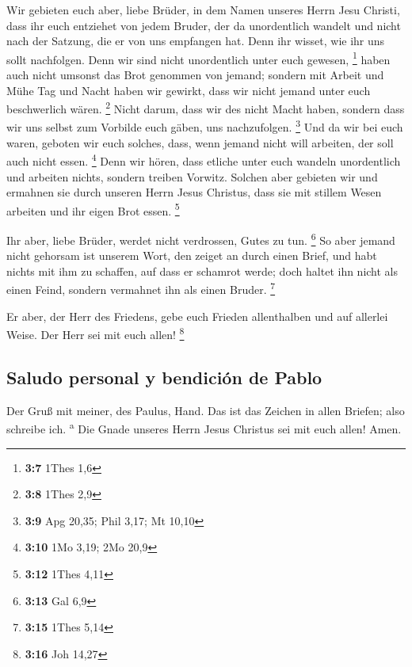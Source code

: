  Wir gebieten euch aber, liebe Brüder, in dem Namen
unseres Herrn Jesu Christi, dass ihr euch entziehet von jedem Bruder,
der da unordentlich wandelt und nicht nach der Satzung, die er von uns
empfangen hat.  Denn ihr wisset, wie ihr uns sollt
nachfolgen. Denn wir sind nicht unordentlich unter euch gewesen,
\footnote{\textbf{3:7} 1Thes 1,6}  haben auch nicht
umsonst das Brot genommen von jemand; sondern mit Arbeit und Mühe Tag
und Nacht haben wir gewirkt, dass wir nicht jemand unter euch
beschwerlich wären. \footnote{\textbf{3:8} 1Thes 2,9} 
Nicht darum, dass wir des nicht Macht haben, sondern dass wir uns selbst
zum Vorbilde euch gäben, uns nachzufolgen. \footnote{\textbf{3:9} Apg
  20,35; Phil 3,17; Mt 10,10}  Und da wir bei euch waren,
geboten wir euch solches, dass, wenn jemand nicht will arbeiten, der
soll auch nicht essen. \footnote{\textbf{3:10} 1Mo 3,19; 2Mo 20,9}
 Denn wir hören, dass etliche unter euch wandeln
unordentlich und arbeiten nichts, sondern treiben Vorwitz.
 Solchen aber gebieten wir und ermahnen sie durch unseren
Herrn Jesus Christus, dass sie mit stillem Wesen arbeiten und ihr eigen
Brot essen. \footnote{\textbf{3:12} 1Thes 4,11}

 Ihr aber, liebe Brüder, werdet nicht verdrossen, Gutes
zu tun. \footnote{\textbf{3:13} Gal 6,9}  So aber jemand
nicht gehorsam ist unserem Wort, den zeiget an durch einen Brief, und
habt nichts mit ihm zu schaffen, auf dass er schamrot werde;
 doch haltet ihn nicht als einen Feind, sondern vermahnet
ihn als einen Bruder. \footnote{\textbf{3:15} 1Thes 5,14}

 Er aber, der Herr des Friedens, gebe euch Frieden
allenthalben und auf allerlei Weise. Der Herr sei mit euch allen!
\footnote{\textbf{3:16} Joh 14,27}

\hypertarget{saludo-personal-y-bendiciuxf3n-de-pablo}{%
\subsection{Saludo personal y bendición de
Pablo}\label{saludo-personal-y-bendiciuxf3n-de-pablo}}

 Der Gruß mit meiner, des Paulus, Hand. Das ist das
Zeichen in allen Briefen; also schreibe ich. \textsuperscript{a}
 Die Gnade unseres Herrn Jesus Christus sei mit euch
allen! Amen.
